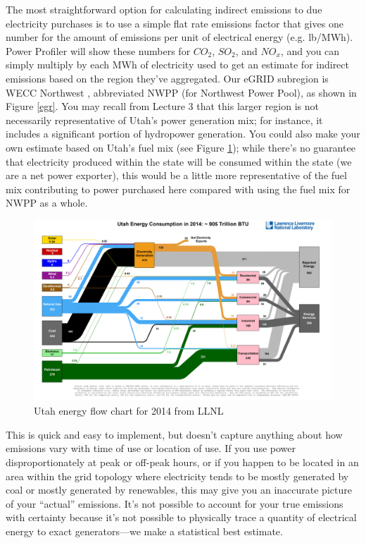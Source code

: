 \documentclass[10pt]{article}
\begin{document}
The most straightforward option for calculating indirect emissions to due electricity purchases is to use a simple flat rate emissions factor that gives one number for the amount of emissions per unit of electrical energy (e.g. lb/MWh). Power Profiler will show these numbers for $CO_2$, $SO_2$, and $NO_x$, and you can simply multiply by each MWh of electricity used to get an estimate for indirect emissions based on the region they've aggregated. Our eGRID subregion is WECC Northwest \cite{eGRIDsupportdoc2016}, abbreviated NWPP (for Northwest Power Pool), as shown in Figure \ref{egr}. You may recall from Lecture 3 that this larger region is not necessarily representative of Utah's power generation mix; for instance, it includes a significant portion of hydropower generation. You could also make your own estimate based on Utah's fuel mix (see Figure \ref{sankeyUT}); while there's no guarantee that electricity produced within the state will be consumed within the state (we are a net power exporter), this would be a little more representative of the fuel mix contributing to power purchased here compared with using the fuel mix for NWPP as a whole.



            \begin{figure}[h]
            \includegraphics[width=6.5in]{extras18/sankeyEnergy_2014_UT.png}
            \caption{Utah energy flow chart for {\color{blue}2014} from LLNL \cite{noauthor_undated-zv}}
            \label{sankeyUT}
            \end{figure}



This is quick and easy to implement, but doesn't capture anything about how emissions vary with time of use or location of use. If you use power disproportionately at peak or off-peak hours, or if you happen to be located in an area within the grid topology where electricity tends to be mostly generated by coal or mostly generated by renewables, this may give you an inaccurate picture of your ``actual'' emissions. It's not possible to account for your true emissions with certainty because it's not possible to physically trace a quantity of electrical energy to exact generators---we make a statistical best estimate.
\end{document}
